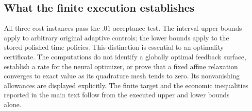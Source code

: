 \subsection{What the finite execution establishes}
All three cost instances pass the $.01$ acceptance test. The interval upper bounds apply to arbitrary original adaptive controls; the lower bounds apply to the stored polished time policies. This distinction is essential to an optimality certificate. The computations do not identify a globally optimal feedback surface, establish a rate for the neural optimizer, or prove that a fixed affine relaxation converges to exact value as its quadrature mesh tends to zero. Its nonvanishing allowances are displayed explicitly. The finite target and the economic inequalities reported in the main text follow from the executed upper and lower bounds alone.
